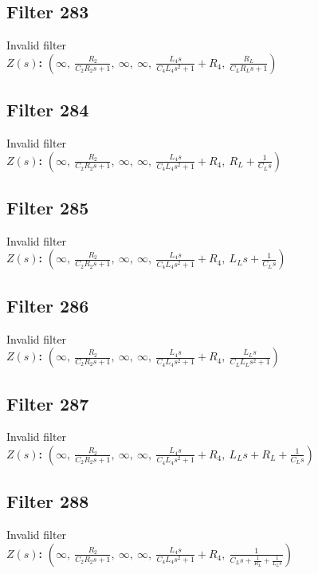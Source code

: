\documentclass{article}
\begin{document}
\subsection*{Filter 283}
Invalid filter \\ 
\textbf{$Z(s)$:} $\left( \infty, \  \frac{R_{2}}{C_{2} R_{2} s + 1}, \  \infty, \  \infty, \  \frac{L_{4} s}{C_{4} L_{4} s^{2} + 1} + R_{4}, \  \frac{R_{L}}{C_{L} R_{L} s + 1}\right)$ \\ 
\subsection*{Filter 284}
Invalid filter \\ 
\textbf{$Z(s)$:} $\left( \infty, \  \frac{R_{2}}{C_{2} R_{2} s + 1}, \  \infty, \  \infty, \  \frac{L_{4} s}{C_{4} L_{4} s^{2} + 1} + R_{4}, \  R_{L} + \frac{1}{C_{L} s}\right)$ \\ 
\subsection*{Filter 285}
Invalid filter \\ 
\textbf{$Z(s)$:} $\left( \infty, \  \frac{R_{2}}{C_{2} R_{2} s + 1}, \  \infty, \  \infty, \  \frac{L_{4} s}{C_{4} L_{4} s^{2} + 1} + R_{4}, \  L_{L} s + \frac{1}{C_{L} s}\right)$ \\ 
\subsection*{Filter 286}
Invalid filter \\ 
\textbf{$Z(s)$:} $\left( \infty, \  \frac{R_{2}}{C_{2} R_{2} s + 1}, \  \infty, \  \infty, \  \frac{L_{4} s}{C_{4} L_{4} s^{2} + 1} + R_{4}, \  \frac{L_{L} s}{C_{L} L_{L} s^{2} + 1}\right)$ \\ 
\subsection*{Filter 287}
Invalid filter \\ 
\textbf{$Z(s)$:} $\left( \infty, \  \frac{R_{2}}{C_{2} R_{2} s + 1}, \  \infty, \  \infty, \  \frac{L_{4} s}{C_{4} L_{4} s^{2} + 1} + R_{4}, \  L_{L} s + R_{L} + \frac{1}{C_{L} s}\right)$ \\ 
\subsection*{Filter 288}
Invalid filter \\ 
\textbf{$Z(s)$:} $\left( \infty, \  \frac{R_{2}}{C_{2} R_{2} s + 1}, \  \infty, \  \infty, \  \frac{L_{4} s}{C_{4} L_{4} s^{2} + 1} + R_{4}, \  \frac{1}{C_{L} s + \frac{1}{R_{L}} + \frac{1}{L_{L} s}}\right)$ \\ 
\end{document}

